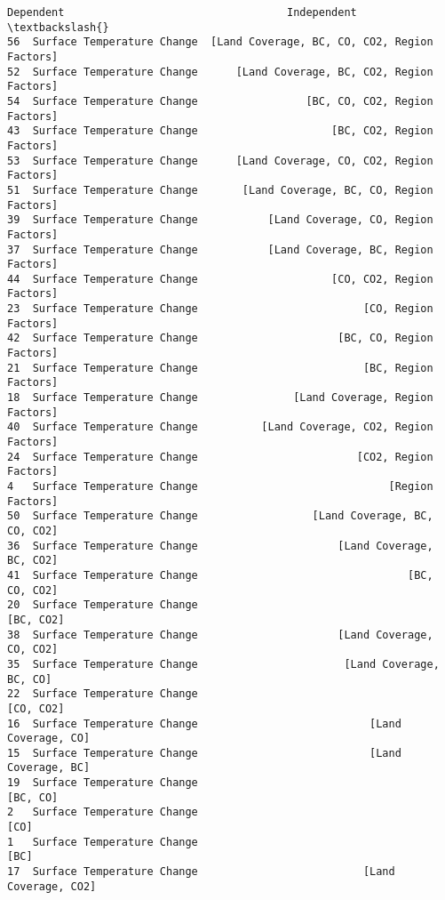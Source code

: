 \documentclass[11pt]{article}
\makeatletter
\newcommand{\boxspacing}{\kern\kvtcb@left@rule\kern\kvtcb@boxsep}
\newcommand{\prompt}[4]{
        {\ttfamily\llap{{\color{#2}[#3]:\hspace{3pt}#4}}\vspace{-\baselineskip}}
    }
\makeatother
\begin{document}
            \begin{tcolorbox}[breakable, size=fbox, boxrule=.5pt, pad at break*=1mm, opacityfill=0]
\prompt{Out}{outcolor}{123}{\boxspacing}
\begin{Verbatim}[commandchars=\\\{\}]
                     Dependent                                   Independent  \textbackslash{}
56  Surface Temperature Change  [Land Coverage, BC, CO, CO2, Region Factors]
52  Surface Temperature Change      [Land Coverage, BC, CO2, Region Factors]
54  Surface Temperature Change                 [BC, CO, CO2, Region Factors]
43  Surface Temperature Change                     [BC, CO2, Region Factors]
53  Surface Temperature Change      [Land Coverage, CO, CO2, Region Factors]
51  Surface Temperature Change       [Land Coverage, BC, CO, Region Factors]
39  Surface Temperature Change           [Land Coverage, CO, Region Factors]
37  Surface Temperature Change           [Land Coverage, BC, Region Factors]
44  Surface Temperature Change                     [CO, CO2, Region Factors]
23  Surface Temperature Change                          [CO, Region Factors]
42  Surface Temperature Change                      [BC, CO, Region Factors]
21  Surface Temperature Change                          [BC, Region Factors]
18  Surface Temperature Change               [Land Coverage, Region Factors]
40  Surface Temperature Change          [Land Coverage, CO2, Region Factors]
24  Surface Temperature Change                         [CO2, Region Factors]
4   Surface Temperature Change                              [Region Factors]
50  Surface Temperature Change                  [Land Coverage, BC, CO, CO2]
36  Surface Temperature Change                      [Land Coverage, BC, CO2]
41  Surface Temperature Change                                 [BC, CO, CO2]
20  Surface Temperature Change                                     [BC, CO2]
38  Surface Temperature Change                      [Land Coverage, CO, CO2]
35  Surface Temperature Change                       [Land Coverage, BC, CO]
22  Surface Temperature Change                                     [CO, CO2]
16  Surface Temperature Change                           [Land Coverage, CO]
15  Surface Temperature Change                           [Land Coverage, BC]
19  Surface Temperature Change                                      [BC, CO]
2   Surface Temperature Change                                          [CO]
1   Surface Temperature Change                                          [BC]
17  Surface Temperature Change                          [Land Coverage, CO2]

\end{Verbatim}
\end{tcolorbox}
\end{document}
